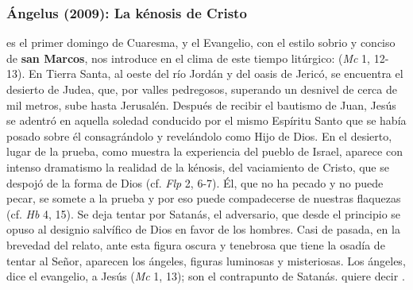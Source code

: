 \subsubsection{Ángelus (2009): La kénosis de Cristo}


\begin{body}
 es el primer domingo de Cuaresma, y el Evangelio, con el estilo sobrio y conciso de \textbf{san Marcos}, nos introduce en el clima de este tiempo litúrgico:  (\textit{Mc} 1, 12-13). En Tierra Santa, al oeste del río Jordán y del oasis de Jericó, se encuentra el desierto de Judea, que, por valles pedregosos, superando un desnivel de cerca de mil metros, sube hasta Jerusalén. Después de recibir el bautismo de Juan, Jesús se adentró en aquella soledad conducido por el mismo Espíritu Santo que se había posado sobre él consagrándolo y revelándolo como Hijo de Dios. En el desierto, lugar de la prueba, como muestra la experiencia del pueblo de Israel, aparece con intenso dramatismo la realidad de la kénosis, del vaciamiento de Cristo, que se despojó de la forma de Dios (cf. \textit{Flp} 2, 6-7). Él, que no ha pecado y no puede pecar, se somete a la prueba y por eso puede compadecerse de nuestras flaquezas (cf. \textit{Hb} 4, 15). Se deja tentar por Satanás, el adversario, que desde el principio se opuso al designio salvífico de Dios en favor de los hombres. Casi de pasada, en la brevedad del relato, ante esta figura oscura y tenebrosa que tiene la osadía de tentar al Señor, aparecen los ángeles, figuras luminosas y misteriosas. Los ángeles, dice el evangelio,  a Jesús (\textit{Mc} 1, 13); son el contrapunto de Satanás.  quiere decir . 


\end{body}
